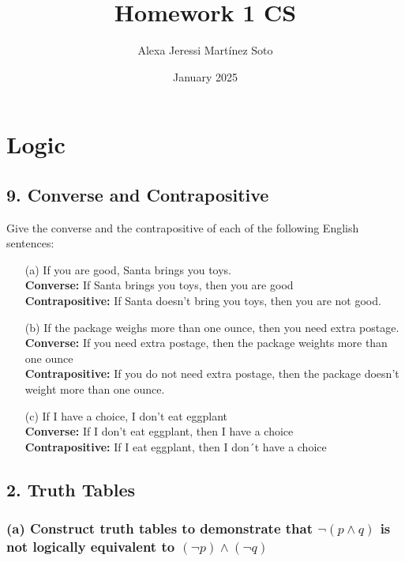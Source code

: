 \documentclass{article}
\title{Homework 1 CS}
\author{Alexa Jeressi Martínez Soto}
\date{January 2025}
\begin{document}
\maketitle

\section{Logic}
\subsection*{9. Converse and Contrapositive}

Give the converse and the contrapositive of each of the following English sentences:

\begin{enumerate}
    \item[(a)] If you are good, Santa brings you toys.
    \\ 
    \textbf{Converse:} If Santa brings you toys, then you are good
    \\ 
    \textbf{Contrapositive:} If Santa doesn't bring you toys, then you are not good.
    
    \item[(b)] If the package weighs more than one ounce, then you need extra postage.
    \\ 
    \textbf{Converse:} If you need extra postage, then the package weights more than one ounce
    \\ 
    \textbf{Contrapositive:} If you do not need extra postage, then the package doesn't weight more than one ounce.
    
    \item[(c)] If I have a choice, I don't eat eggplant
    \\ 
    \textbf{Converse:} If I don’t eat eggplant, then I have a choice
    \\ 
    \textbf{Contrapositive:} If I eat eggplant, then I don´t have a choice
\end{enumerate}

\subsection*{2. Truth Tables}

\subsubsection*{(a) Construct truth tables to demonstrate that $\neg(p \land q)$ is not logically equivalent to $(\neg p) \land (\neg q)$}
\end{document}
